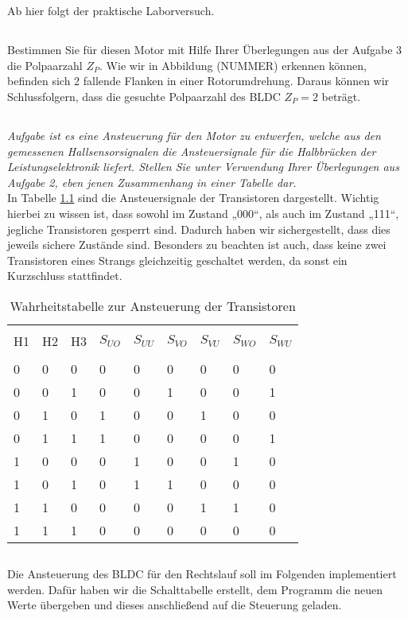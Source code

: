 \chapter{}\label{ch:auf4}
Ab hier folgt der praktische Laborversuch.

\section{}\label{sec:4a}
Bestimmen Sie für diesen Motor mit Hilfe Ihrer Überlegungen aus der Aufgabe 3 die Polpaarzahl $ Z_{P} $.
Wie wir in Abbildung (NUMMER) erkennen können, befinden sich 2 fallende Flanken in einer Rotorumdrehung. Daraus können wir Schlussfolgern, dass die gesuchte Polpaarzahl des BLDC $ Z_{P} = 2  $ beträgt.

\section{}\label{sec:4b}
\textit{Aufgabe ist es eine Ansteuerung für den Motor zu entwerfen, welche aus den gemessenen Hallsensorsignalen die Ansteuersignale für die Halbbrücken der Leistungselektronik liefert. Stellen Sie unter Verwendung Ihrer Überlegungen aus Aufgabe 2, eben jenen Zusammenhang in einer Tabelle dar.}\\
In Tabelle \ref{tab:4b:werte} sind die Ansteuersignale der Transistoren dargestellt. Wichtig hierbei zu wissen ist, dass sowohl im Zustand „000“, als auch im Zustand „111“, jegliche Transistoren gesperrt sind. Dadurch haben wir sichergestellt, dass dies jeweils sichere Zustände sind. Besonders zu beachten ist auch, dass keine zwei Transistoren eines Strangs gleichzeitig geschaltet werden, da sonst ein Kurzschluss stattfindet.\\
\begin{table}[h]
	\centering
	\begin{tabular}{p{1cm} p{1cm} p{1cm} | p{1cm} p{1cm} p{1cm} p{1cm} p{1cm} p{1cm}}
		&&&&&&&&\\[-1em]
		H1 & H2 & H3 & $ S_{UO} $ & $ S_{UU} $ & $ S_{VO} $ & $ S_{VU} $ & $ S_{WO} $ & $ S_{WU} $ \\
		\hline &&&&&&&&\\[-1em]
		  0 &  0 &  0 &   0 &   0 &   0 &   0 &   0 &   0 \\
		  0 &  0 &  1 &   0 &   0 &   1 &   0 &   0 &   1 \\
		  0 &  1 &  0 &   1 &   0 &   0 &   1 &   0 &   0 \\
		  0 &  1 &  1 &   1 &   0 &   0 &   0 &   0 &   1 \\
		  1 &  0 &  0 &   0 &   1 &   0 &   0 &   1 &   0 \\
		  1 &  0 &  1 &   0 &   1 &   1 &   0 &   0 &   0 \\
		  1 &  1 &  0 &   0 &   0 &   0 &   1 &   1 &   0 \\
		  1 &  1 &  1 &   0 &   0 &   0 &   0 &   0 &   0 \\
	\end{tabular}
	\caption{Wahrheitstabelle zur Ansteuerung der Transistoren}
	\label{tab:4b:werte}
\end{table}

\section{}\label{sec:4c}
Die Ansteuerung des BLDC für den Rechtslauf soll im Folgenden implementiert werden. Dafür haben wir die Schalttabelle erstellt, dem Programm die neuen Werte übergeben und dieses anschließend auf die Steuerung geladen.

